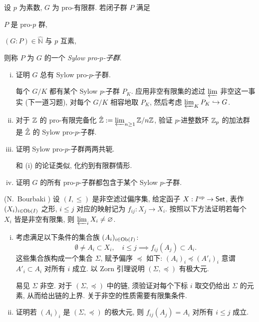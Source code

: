 \begin{Exercises}
	\item 设 $p$ 为素数, $G$ 为 pro-有限群. 若闭子群 $P$ 满足
	\begin{inparaenum}
		\item $P$ 是 pro-$p$ 群,
		\item $(G:P) \in \hat{\mathbb{N}}$ 与 $p$ 互素,
	\end{inparaenum}
	则称 $P$ 为 $G$ 的一个 \emph{Sylow pro-$p$-子群}.
	\begin{enumerate}[(i)]
		\item 证明 $G$ 总有 Sylow pro-$p$-子群.
		\begin{hint}
			每个 $G/K$ 都有某个 Sylow $p$-子群 $P_K$. 应用非空有限集的滤过 $\varprojlim$ 非空这一事实 (下一道习题), 对每个 $G/K$ 相容地取 $P_K$, 然后考虑 $\varprojlim_K P_K \hookrightarrow G$.
		\end{hint}
		\item 对于 $\Z$ 的 pro-有限完备化 $\hat{\Z} := \varprojlim_{n \geq 1} \Z/n\Z$, 验证 $p$-进整数环 $\Z_p$ 的加法群是 $\hat{\Z}$ 的 Sylow pro-$p$-子群.
		\item 证明 Sylow pro-$p$-子群两两共轭.
		\begin{hint}
			和 (i) 的论证类似, 化约到有限群情形.
		\end{hint}
		\item 证明 $G$ 的所有 pro-$p$-子群都包含于某个 Sylow $p$-子群.
	\end{enumerate}
	
	\item (N.\ Bourbaki \cite[III.58 Théorème 1]{BouE}) 设 $(I, \leq)$ 是非空滤过偏序集, 给定函子 $X: I^{\opp} \to \cate{Set}$, 表作 $(X_i)_{i \in \Obj(I)}$ 之形, $i \leq j$ 对应的映射记为 $f_{ij}: X_j \to X_i$. 按照以下方法证明若每个 $X_i$ 皆是非空有限集, 则 $\varprojlim_i X_i \neq \emptyset$.
	\begin{enumerate}[(i)]
		\item 考虑满足以下条件的集合族 $(A_i)_{i \in \Obj(I)}$:
		\[ \emptyset \neq A_i \subset X_i, \quad i \leq j \implies f_{ij}(A_j) \subset A_i . \]
		这些集合族构成一个集合 $\Sigma$, 赋予偏序 $\preceq$ 如下: $(A_i)_i \preceq (A'_i)_i$ 意谓 $A'_i \subset A_i$ 对所有 $i$ 成立. 以 Zorn 引理说明 $(\Sigma, \preceq)$ 有极大元.
		
		\begin{hint}
			易见 $\Sigma$ 非空. 对于 $(\Sigma, \preceq)$ 中的链, 须验证对每个下标 $i$ 取交仍给出 $\Sigma$ 的元素, 从而给出链的上界. 关于非空的性质需要有限集条件.
		\end{hint}
		
		\item 证明若 $(A_i)_i$ 是 $(\Sigma, \preceq)$ 的极大元, 则 $f_{ij}(A_j) = A_i$ 对所有 $i \leq j$ 成立.
		

\end{enumerate}
\end{Exercises}
